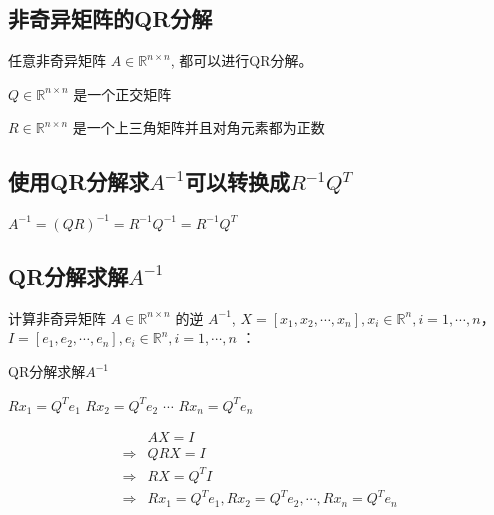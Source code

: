 \subsection{非奇异矩阵的QR分解}

\begin{theorem}
    任意非奇异矩阵 $ A \in \mathbb{R}^{n \times n} $, 都可以进行QR分解。
\end{theorem}

\begin{corollary}
    $ Q \in \mathbb{R}^{n \times n} $ 是一个正交矩阵
\end{corollary}

\begin{corollary}
    $ R \in \mathbb{R}^{n \times n} $ 是一个上三角矩阵并且对角元素都为正数
\end{corollary}


\subsection{使用QR分解求$A^{-1}$可以转换成$R^{-1} Q^{T}$}

\begin{theorem}
    $ A^{-1}=(Q R)^{-1}=R^{-1} Q^{-1}=R^{-1} Q^{T} $
\end{theorem}

\subsection{QR分解求解$A^{-1}$}


计算非奇异矩阵 $  {A} \in \mathbb{R}^{n \times n} $ 的逆 $  {A}^{-1} $, $X=\left[x_{1}, x_{2}, \cdots, x_{n}\right], x_{i} \in \mathbb{R}^{n}, i=1, \cdots, n$，$I=\left[e_{1}, e_{2}, \cdots, e_{n}\right], e_{i} \in \mathbb{R}^{n}, i=1, \cdots, n$
：

\begin{algorithm}[htbp]
    \caption{QR分解求解$A^{-1}$}
    $R x_{1}= Q^{T} e_{1}$\;
    $R x_{2}=Q^{T} e_{2}$\;
    $\cdots$\;
    $R x_{n}=Q^{T} e_{n}$\;
\end{algorithm}



$$\begin{aligned}
    &AX = I \\
    \Rightarrow&   Q R X=I \\
    \Rightarrow&   R X =Q^{T} I \\
    \Rightarrow&  R x_{1}= Q^{T} e_{1}, R x_{2}=Q^{T} e_{2}, \cdots, R x_{n}=Q^{T} e_{n}
\end{aligned}$$



